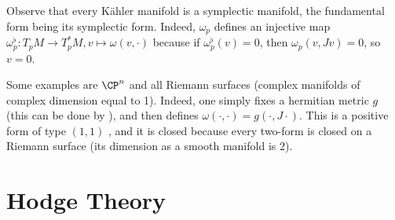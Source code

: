 
Observe that every Kähler manifold is a symplectic manifold, the fundamental form being its symplectic form. Indeed, \(\omega_p\) defines an injective map \(\omega_p^\flat\colon T_pM \to T_p^*M, v \mapsto \omega(v, \cdot)\) because if \(\omega_p^\flat(v)=0\), then \(\omega_p(v,Jv)=0\), so \(v=0\).

\begin{example}
    Some examples are \(\CP^n\) and all Riemann surfaces (complex manifolds of complex dimension equal to 1). Indeed, one simply fixes a hermitian metric \(g\) (this can be done by \parencite[Lemma 8.5]{lee_introCM}), and then defines \(\omega(\cdot, \cdot)=g(\cdot, J \cdot)\). This is a positive form of type \((1,1)\) \parencite[Prop. 8.9]{lee_introCM}, and it is closed because every two-form is closed on a Riemann surface (its dimension as a smooth manifold is \(2\)).
\end{example}

\section{Hodge Theory}
